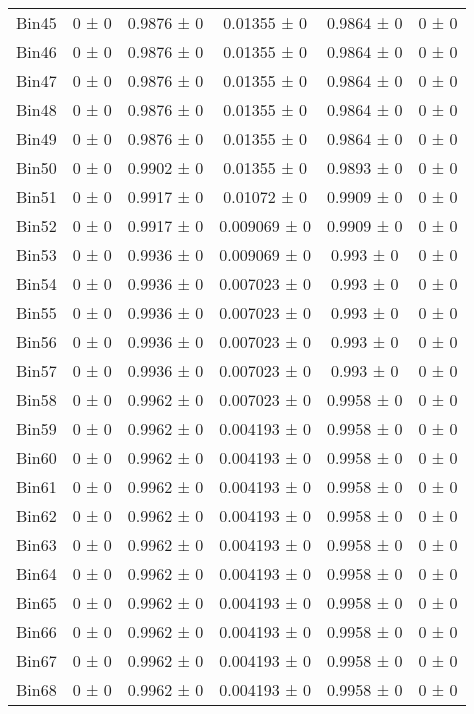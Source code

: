 \begin{tabular}{@{\extracolsep{4pt}}lccccc@{}}
     Bin45 & 0 ± 0 & 0.9876 ± 0 & 0.01355 ± 0 & 0.9864 ± 0 & 0 ± 0 \\ 
     Bin46 & 0 ± 0 & 0.9876 ± 0 & 0.01355 ± 0 & 0.9864 ± 0 & 0 ± 0 \\ 
     Bin47 & 0 ± 0 & 0.9876 ± 0 & 0.01355 ± 0 & 0.9864 ± 0 & 0 ± 0 \\ 
     Bin48 & 0 ± 0 & 0.9876 ± 0 & 0.01355 ± 0 & 0.9864 ± 0 & 0 ± 0 \\ 
     Bin49 & 0 ± 0 & 0.9876 ± 0 & 0.01355 ± 0 & 0.9864 ± 0 & 0 ± 0 \\ 
     Bin50 & 0 ± 0 & 0.9902 ± 0 & 0.01355 ± 0 & 0.9893 ± 0 & 0 ± 0 \\ 
     Bin51 & 0 ± 0 & 0.9917 ± 0 & 0.01072 ± 0 & 0.9909 ± 0 & 0 ± 0 \\ 
     Bin52 & 0 ± 0 & 0.9917 ± 0 & 0.009069 ± 0 & 0.9909 ± 0 & 0 ± 0 \\ 
     Bin53 & 0 ± 0 & 0.9936 ± 0 & 0.009069 ± 0 & 0.993 ± 0 & 0 ± 0 \\ 
     Bin54 & 0 ± 0 & 0.9936 ± 0 & 0.007023 ± 0 & 0.993 ± 0 & 0 ± 0 \\ 
     Bin55 & 0 ± 0 & 0.9936 ± 0 & 0.007023 ± 0 & 0.993 ± 0 & 0 ± 0 \\ 
     Bin56 & 0 ± 0 & 0.9936 ± 0 & 0.007023 ± 0 & 0.993 ± 0 & 0 ± 0 \\ 
     Bin57 & 0 ± 0 & 0.9936 ± 0 & 0.007023 ± 0 & 0.993 ± 0 & 0 ± 0 \\ 
     Bin58 & 0 ± 0 & 0.9962 ± 0 & 0.007023 ± 0 & 0.9958 ± 0 & 0 ± 0 \\ 
     Bin59 & 0 ± 0 & 0.9962 ± 0 & 0.004193 ± 0 & 0.9958 ± 0 & 0 ± 0 \\ 
     Bin60 & 0 ± 0 & 0.9962 ± 0 & 0.004193 ± 0 & 0.9958 ± 0 & 0 ± 0 \\ 
     Bin61 & 0 ± 0 & 0.9962 ± 0 & 0.004193 ± 0 & 0.9958 ± 0 & 0 ± 0 \\ 
     Bin62 & 0 ± 0 & 0.9962 ± 0 & 0.004193 ± 0 & 0.9958 ± 0 & 0 ± 0 \\ 
     Bin63 & 0 ± 0 & 0.9962 ± 0 & 0.004193 ± 0 & 0.9958 ± 0 & 0 ± 0 \\ 
     Bin64 & 0 ± 0 & 0.9962 ± 0 & 0.004193 ± 0 & 0.9958 ± 0 & 0 ± 0 \\ 
     Bin65 & 0 ± 0 & 0.9962 ± 0 & 0.004193 ± 0 & 0.9958 ± 0 & 0 ± 0 \\ 
     Bin66 & 0 ± 0 & 0.9962 ± 0 & 0.004193 ± 0 & 0.9958 ± 0 & 0 ± 0 \\ 
     Bin67 & 0 ± 0 & 0.9962 ± 0 & 0.004193 ± 0 & 0.9958 ± 0 & 0 ± 0 \\ 
     Bin68 & 0 ± 0 & 0.9962 ± 0 & 0.004193 ± 0 & 0.9958 ± 0 & 0 ± 0 \\ 

\end{tabular}
